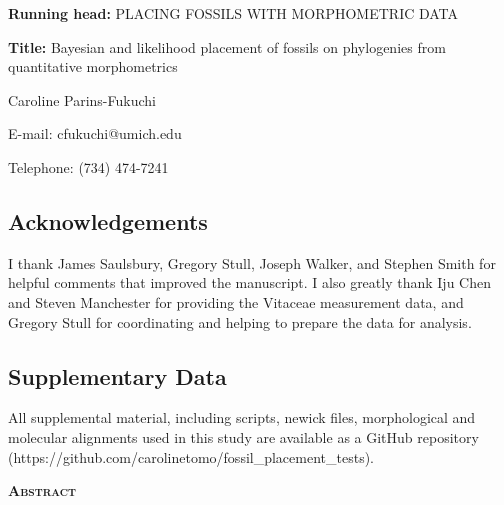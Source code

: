 \documentclass[12pt]{article}
\begin{document}
\setcounter{page}{1}

\noindent \textbf{Running head:} PLACING FOSSILS WITH MORPHOMETRIC DATA

\noindent \textbf{Title:} Bayesian and likelihood placement of fossils on phylogenies from quantitative morphometrics

\noindent Caroline Parins-Fukuchi


\noindent E-mail: cfukuchi@umich.edu

\noindent Telephone: (734) 474-7241

\medskip


\newpage


\subsection*{Acknowledgements}
I  thank James Saulsbury, Gregory Stull, Joseph Walker, and Stephen Smith for helpful comments that improved the manuscript. I also greatly thank Iju Chen and Steven Manchester for providing the Vitaceae measurement data, and Gregory Stull for coordinating and helping to prepare the data for analysis.

\subsection*{Supplementary Data}
All supplemental material, including scripts, newick files, morphological and molecular alignments used in this study are available as a GitHub repository (https://github.com/carolinetomo/fossil\_placement\_tests). 	

\newpage


\noindent \textbf{\textsc{Abstract}}
\end{document}
